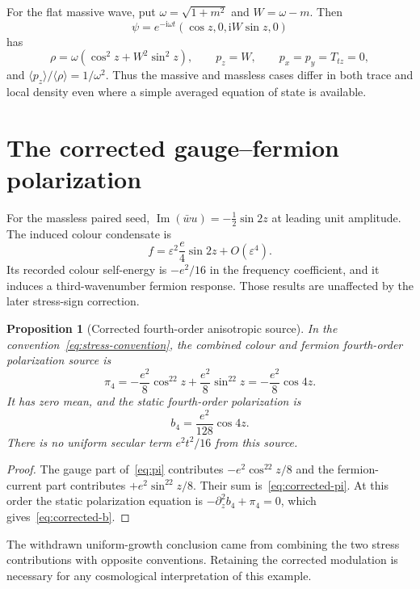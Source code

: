 \documentclass[11pt,a4paper,oneside]{book}
\theoremstyle{plain}
\newtheorem{proposition}[theorem]{Proposition}
\theoremstyle{definition}
\theoremstyle{remark}
\newcommand{\ii}{\mathrm i}
\newcommand{\src}[2]{\cite{#1}}
\begin{document}
For the flat massive wave, put $\omega=\sqrt{1+m^2}$ and $W=\omega-m$. Then
\begin{equation}
 \psi=e^{-\ii\omega t}(\cos z,0,\ii W\sin z,0)
\end{equation}
has
\begin{equation}
 \rho=\omega(\cos^2z+W^2\sin^2z),\qquad p_z=W,
 \qquad p_x=p_y=T_{tz}=0,
\end{equation}
and $\langle p_z\rangle/\langle\rho\rangle=1/\omega^2$. Thus the massive and massless cases differ in both trace and local density even where a simple averaged equation of state is available. \src{R20}{thm:v20v17-wave}

\section{The corrected gauge--fermion polarization}
For the massless paired seed, $\operatorname{Im}(\bar wu)=-\tfrac12\sin2z$ at leading unit amplitude. The induced colour condensate is
\begin{equation}
 f=\varepsilon^2\frac e4\sin2z+O(\varepsilon^4).
 \label{eq:condensate}
\end{equation}
Its recorded colour self-energy is $-e^2/16$ in the frequency coefficient, and it induces a third-wavenumber fermion response. Those results are unaffected by the later stress-sign correction. \cite{R20}

\begin{proposition}[Corrected fourth-order anisotropic source]
\label{prop:corrected-polarization}
In the convention~\eqref{eq:stress-convention}, the combined colour and fermion fourth-order polarization source is
\begin{equation}
 \pi_4=-\frac{e^2}{8}\cos^22z+\frac{e^2}{8}\sin^22z
 =-\frac{e^2}{8}\cos4z.
 \label{eq:corrected-pi}
\end{equation}
It has zero mean, and the static fourth-order polarization is
\begin{equation}
 b_4=\frac{e^2}{128}\cos4z.
 \label{eq:corrected-b}
\end{equation}
There is no uniform secular term $e^2t^2/16$ from this source.
\end{proposition}
\begin{proof}
The gauge part of~\eqref{eq:pi} contributes $-e^2\cos^22z/8$ and the fermion-current part contributes $+e^2\sin^22z/8$. Their sum is~\eqref{eq:corrected-pi}. At this order the static polarization equation is $-\partial_z^2b_4+\pi_4=0$, which gives~\eqref{eq:corrected-b}.
\end{proof}
\src{R20}{prop:v20v24-corrigendum}
The withdrawn uniform-growth conclusion came from combining the two stress contributions with opposite conventions. Retaining the corrected modulation is necessary for any cosmological interpretation of this example.
\end{document}
